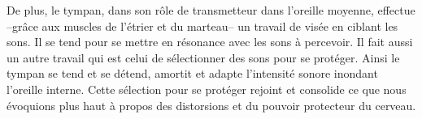 De plus, le tympan, dans son rôle de transmetteur dans l'oreille
          moyenne, effectue --grâce aux muscles de l'étrier et du marteau--
		un travail de visée en ciblant les sons. Il
se tend
		pour se mettre en résonance avec les sons à percevoir.
               Il fait aussi un autre travail qui est celui de sélectionner des
sons
		pour se protéger. Ainsi le tympan se tend et se détend,
              amortit et adapte
l'intensité
		sonore inondant  l'oreille interne. Cette sélection pour se  protéger rejoint et consolide ce que nous 
		évoquions plus haut à propos des 
distorsions et du pouvoir protecteur du cerveau.




